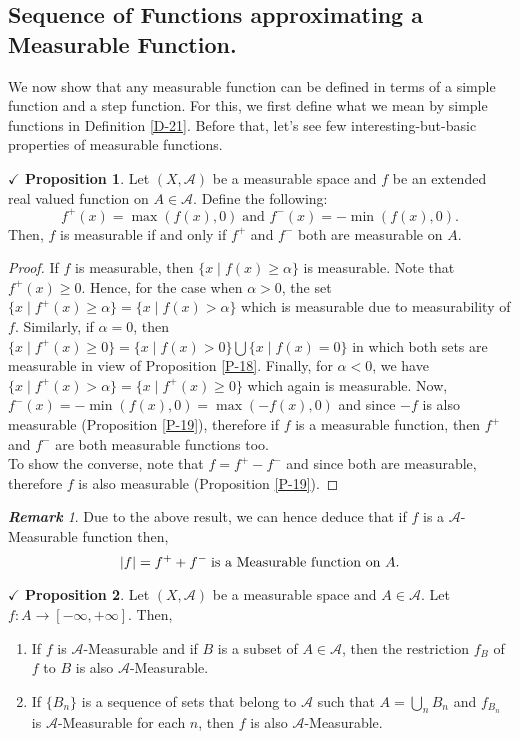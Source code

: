 \documentclass{article}
\theoremstyle{definition}
\theoremstyle{remark}
\newtheorem*{remark}{\textbf{Remark}}
\theoremstyle{definition}
\theoremstyle{definition}
\newtheorem{proposition}{$\checkmark$ Proposition}
\theoremstyle{definition}
\DeclarePairedDelimiter\abs{\lvert}{\rvert}
\newcommand{\bunion}{\bigcup}
\newcommand{\where}{\;\vert\;}
\newcommand{\alg}[1]{\mathscr{#1}}
\begin{document}
\subsection{Sequence of Functions approximating a Measurable Function.}
We now show that any measurable function can be defined in terms of a simple function and a step function. For this, we first define what we mean by simple functions in Definition \ref{D-21}. Before that, let's see few interesting-but-basic properties of measurable functions. 
\begin{proposition}\label{P-25}
	Let $ (X,\alg{A}) $ be a measurable space and $ f $ be an extended real valued function on $ A\in \alg{A} $. Define the following:
	\[f^{+}(x) = \max (f(x),0)\;\text{and } f^{-}(x) = -\min (f(x),0).\]
	Then, $ f $ is measurable if and only if $ f^{+} $ and $ f^{-} $ both are measurable on $ A $.
\end{proposition}
\begin{proof}
	If $ f $ is measurable, then $ \{x\where f(x)\ge \alpha\} $ is measurable. Note that $ f^{+}(x) \ge 0$. Hence, for the case when $ \alpha > 0 $, the set $ \{x\where f^{+}(x)\ge \alpha\} = \{x\where f(x) > \alpha\}$ which is measurable due to measurability of $ f $. Similarly, if $ \alpha = 0 $, then $ \{x\where f^{+}(x)\ge 0\} = \{x\where f(x)> 0\} \bunion \{x\where f(x) = 0\} $ in which both sets are measurable in view of Proposition \ref{P-18}. Finally, for $ \alpha<0 $, we have $ \{x\where f^{+}(x)> \alpha\} = \{x\where f^{+}(x)\ge 0\}$ which again is measurable. Now, $ f^{-}(x) = -\min(f(x),0) = \max(-f(x),0)$ and since $ -f $ is also measurable (Proposition \ref{P-19}), therefore if $ f $ is a measurable function, then $ f^{+} $ and $ f^{-} $ are both measurable functions too.\\
	To show the converse, note that $ f = f^{+} - f^{-} $ and since both are measurable, therefore $ f $ is also measurable (Proposition \ref{P-19}).
\end{proof}
\begin{remark}
	Due to the above result, we can hence deduce that if $ f $ is a $ \alg{A} $-Measurable function then,
	\[\abs{f} = f^{+} + f^{-}\;\text{is a Measurable function on $ A $.}\]
\end{remark}
\hrulefill
\begin{proposition}
	Let $ (X,\alg{A}) $ be a measurable space and $ A\in \alg{A} $. Let $ f : A\to [-\infty,+\infty]$. Then,
	\begin{enumerate}
		\item {If $ f $ is $ \alg{A} $-Measurable and if $ B $ is a subset of $ A \in \alg{A}$, then the restriction $ f_{B} $ of $ f $ to $ B $ is also $ \alg{A} $-Measurable. }
		\item {If $ \{B_n\} $ is a sequence of sets that belong to $ \alg{A} $ such that $ A = \bunion_{n}B_n $ and $ f_{B_n} $ is $ \alg{A}$-Measurable for each $ n $, then $ f $ is also $ \alg{A} $-Measurable.}
	\end{enumerate}
\end{proposition}
\end{document}
